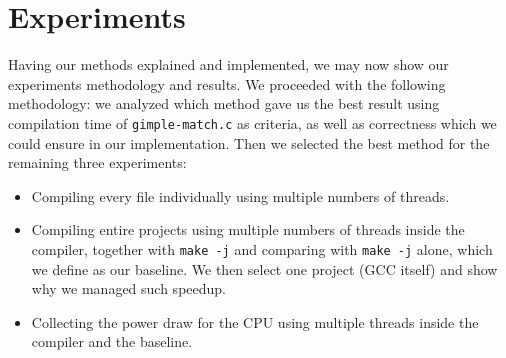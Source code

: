 %
%
%
%
%
%
%

\chapter{Experiments}\label{cap:experiments}

Having our methods explained and implemented, we may now show our experiments
methodology and results. We proceeded with the following methodology: we
analyzed which method gave us the best result using compilation time of
\texttt{gimple-match.c} as criteria, as well as correctness which we could
ensure in our implementation. Then we selected the best method for the
remaining three experiments:
\begin{itemize}
  \item Compiling every file individually using multiple numbers of threads.
  \item Compiling entire projects using multiple numbers of threads inside the
	compiler, together with \texttt{make -j} and comparing with \texttt{make -j} alone,
	which we define as our baseline. We then select one project (GCC itself) and
	show why we managed such speedup.
  \item Collecting the power draw for the CPU using multiple threads inside the
compiler and the baseline.
\end{itemize}

